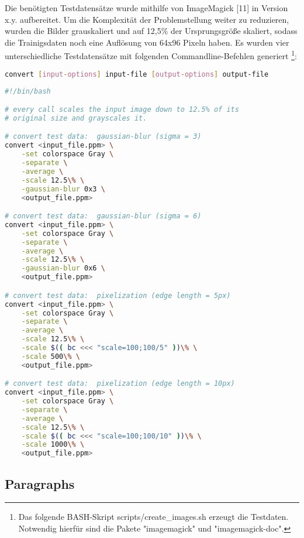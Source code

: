 \documentclass[
12pt, %
a4paper, %
oneside, %
headinclude,footinclude, %
BCOR5mm, %
german]{scrartcl}
\begin{document}
Die benötigten Testdatensätze wurde mithilfe von ImageMagick [11] in Version x.y. aufbereitet. Um die Komplexität der
Problemstellung weiter zu reduzieren, wurden die Bilder grauskaliert und auf 12,5\% der Ursprungsgröße skaliert, sodass
die Trainigsdaten noch eine Auflösung von 64x96 Pixeln haben. Es wurden vier unterschiedliche Testdatensätze mit
folgenden Commandline-Befehlen generiert \footnote{Das folgende BASH-Skript scripts/create\_images.sh erzeugt die
Testdaten. Notwendig hierfür sind die Pakete "imagemagick" und "imagemagick-doc".}:

\begin{lstlisting}[language=bash,caption={convert - Synopsis}]
convert [input-options] input-file [output-options] output-file
\end{lstlisting}

\begin{minipage}{\linewidth}
\begin{lstlisting}[language=bash,caption={Testdatenerstellung - Graustufen}]
#!/bin/bash

# every call scales the input image down to 12.5% of its
# original size and grayscales it.

# convert test data:  gaussian-blur (sigma = 3)
convert <input_file.ppm> \
    -set colorspace Gray \
    -separate \
    -average \
    -scale 12.5\% \
    -gaussian-blur 0x3 \
    <output_file.ppm>

# convert test data:  gaussian-blur (sigma = 6)
convert <input_file.ppm> \
    -set colorspace Gray \
    -separate \
    -average \
    -scale 12.5\% \
    -gaussian-blur 0x6 \
    <output_file.ppm>

# convert test data:  pixelization (edge length = 5px)
convert <input_file.ppm> \
    -set colorspace Gray \
    -separate \
    -average \
    -scale 12.5\% \
    -scale $(( bc <<< "scale=100;100/5" ))\% \
    -scale 500\% \
    <output_file.ppm>

# convert test data:  pixelization (edge length = 10px)
convert <input_file.ppm> \
    -set colorspace Gray \
    -separate \
    -average \
    -scale 12.5\% \
    -scale $(( bc <<< "scale=100;100/10" ))\% \
    -scale 1000\% \
    <output_file.ppm>
\end{lstlisting}
\end{minipage}


\subsection{Paragraphs}
\end{document}

